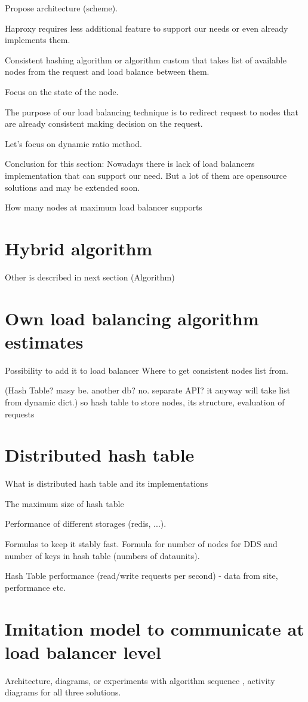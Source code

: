 \documentclass{report}
\begin{document}
Propose architecture (scheme).

Haproxy requires less additional feature to support our needs or even already implements them.

Consistent hashing algorithm or algorithm custom that takes list of available nodes from the request and load balance between them.

Focus on the state of the node.


The purpose of our load balancing technique is to redirect request to nodes that are already consistent making decision on the request.

Let's focus on dynamic ratio method.


Conclusion for this section: Nowadays there is lack of load balancers implementation that can support our need.
But a lot of them are opensource solutions and may be extended soon.


How many nodes at maximum load balancer supports
\chapter{Hybrid algorithm}
Other is described in next section (Algorithm)
\chapter{Own load balancing algorithm estimates}
Possibility to add it to load balancer
Where to get consistent nodes list from.

(Hash Table? masy be. another db? no. separate API? it anyway will take list from dynamic dict.)
so hash table to store nodes, its structure, evaluation of requests

\chapter{Distributed hash table}
What is distributed hash table and its implementations



The maximum size of hash table


Performance of different storages (redis, ...).


Formulas to keep it stably fast. 
Formula for number of nodes for DDS and number of keys in hash table (numbers of dataunits). 

Hash Table performance (read/write requests per second) - data from site, performance etc.


\chapter{Imitation model to communicate at load balancer level}
Architecture,  diagrams, or experiments with algorithm
sequence , activity diagrams for all three solutions.
\end{document}
